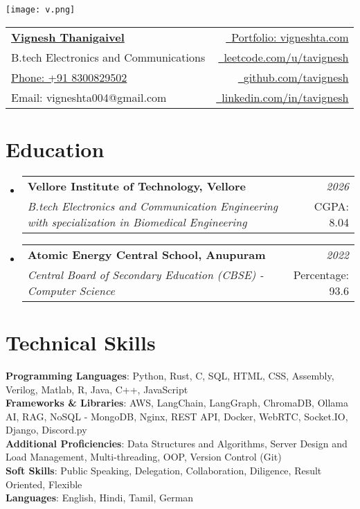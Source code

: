 \documentclass[a4paper,11pt]{article}
\makeatletter
\newcommand{\resumeSubheading}[4]{
\vspace{0.5mm}\item
    \begin{tabular*}{0.98\textwidth}[t]{l@{\extracolsep{\fill}}r}
        \textbf{#1} & \textit{\footnotesize{#4}} \\
        \textit{\footnotesize{#3}} &  \footnotesize{#2}\\
    \end{tabular*}
    \vspace{-2.4mm}
}
\newcommand{\resumeSubHeadingListStart}{\begin{itemize}[leftmargin=*,labelsep=0mm]}
\newcommand{\resumeSubHeadingListEnd}{\end{itemize}\vspace{2mm}}
\newcommand{\name}{\href{https://vigneshta.com}{Vignesh Thanigaivel}} %
\newcommand{\roll}{B.tech Electronics and Communications} %
\newcommand{\phone}{Portfolio: vigneshta.com}
\newcommand{\emailb}{leetcode.com/u/tavignesh}
\makeatother
\begin{document}
\selectfont


\parbox{2.35cm}{%
\texttt{[image: v.png]}}
\parbox{\dimexpr\linewidth-2.8cm\relax}{
\begin{tabularx}{\linewidth}{L r} 
  \textbf{\Large \name} & \href{https://vigneshta.com}{\raisebox{0.0\height}{\footnotesize \faGlobe}\ {\phone}}\\
  {\roll} & \href{https://leetcode.com/u/tavignesh/}{\raisebox{0.0\height}{\footnotesize \faCode}\ {\emailb}} \\
  {\href{tel:+918300829502}{Phone: +91 8300829502}} &  \href{https://github.com/tavignesh/}{\raisebox{0.0\height}{\footnotesize \faGithub}\ {github.com/tavignesh}} \\
  {Email: vigneshta004@gmail.com } & \href{https://www.linkedin.com/in/tavignesh}{\raisebox{0.0\height}{\footnotesize \faLinkedin}\ {linkedin.com/in/tavignesh}}
\end{tabularx}
}



\section{\textbf{Education}}
  \resumeSubHeadingListStart
    \resumeSubheading
      {Vellore Institute of Technology, Vellore}{CGPA: 8.04}
      {B.tech Electronics and Communication Engineering with specialization in Biomedical Engineering}{2026}
    \resumeSubheading
      {Atomic Energy Central School, Anupuram}{Percentage: 93.6}
      {Central Board of Secondary Education (CBSE) - Computer Science}{2022}
  \resumeSubHeadingListEnd
\vspace{-5.5mm}
%


\section{\textbf{Technical Skills}}
 \begin{itemize}[leftmargin=0.05in, label={}]
    \small{\item{
     \textbf{Programming Languages}{: Python, Rust, C, SQL, HTML, CSS, Assembly, Verilog, Matlab, R, Java, C++, JavaScript} \\ \vspace{3pt}
     \textbf{Frameworks \& Libraries}{: AWS, LangChain, LangGraph, ChromaDB, Ollama AI, RAG, NoSQL - MongoDB, Nginx, REST API, Docker, WebRTC, Socket.IO, Django, Discord.py} \\ \vspace{3pt}
     \textbf{Additional Proficiencies}{: Data Structures and Algorithms, Server Design and Load Management, Multi-threading, OOP, Version Control (Git)} \\ \vspace{3pt}
     \textbf{Soft Skills}{: Public Speaking, Delegation, Collaboration, Diligence, Result Oriented, Flexible} \\ \vspace{3pt}
     \textbf{Languages}{: English, Hindi, Tamil, German}
    }}
 \end{itemize}
 \vspace{-16pt}
\end{document}
